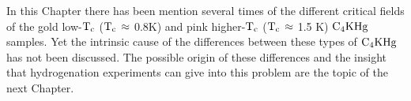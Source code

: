         In  this   Chapter  there has   been mention  several  times of the
different critical fields of the gold  low-$\rm T_c$ ($\rm T_c  \, \approx$
0.8K) and pink higher-$\rm T_c$  ($\rm T_c  \, \approx$ 1.5 K) $\rm C_4KHg$
samples.  Yet the intrinsic cause of the differences between these types of
$\rm  C_4KHg$ has   not been  discussed.  The   possible   origin of these
differences and the insight that  hydrogenation experiments can  give  into
this problem are the topic of the next Chapter.
        


